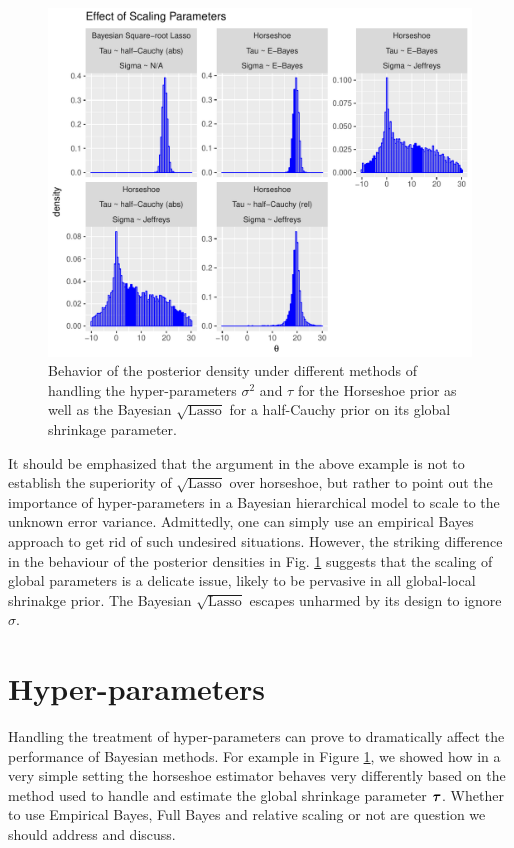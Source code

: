 \documentclass[10pt]{article}
\def\sql{$\sqrt{\text{Lasso}}$}
\begin{document}
\begin{figure}[!ht]%
\centering
\includegraphics[width=0.9\columnwidth]{art/effect_of_sigma}%
\caption{Behavior of the posterior density under different methods of handling the hyper-parameters $\sigma^2$ and $\tau$ for the Horseshoe prior as well as the Bayesian \sql{} for a half-Cauchy prior on its global shrinkage parameter. }%
\label{fig:effect-sigma}%
\end{figure}

It should be emphasized that the argument in the above example is not to establish the superiority of \sql{} over horseshoe, but rather to point out the importance of hyper-parameters in a Bayesian hierarchical model to scale to the unknown error variance. Admittedly, one can simply use an empirical Bayes approach to get rid of such undesired situations. However, the striking difference in the behaviour of the posterior densities in Fig. \ref{fig:effect-sigma} suggests that the scaling of global parameters is a delicate issue, likely to be pervasive in all global-local shrinakge prior. The Bayesian \sql{} escapes unharmed by its design to ignore $\sigma$. 

\section{Hyper-parameters}\label{sec:hyper}

Handling the treatment of hyper-parameters can prove to dramatically affect the performance of Bayesian  methods. For example in Figure \ref{fig:effect-sigma}, we showed how in a very simple setting the horseshoe estimator behaves very differently based on the method used to handle and estimate the global shrinkage parameter $\boldsymbol{\tau}$. Whether to use Empirical Bayes, Full Bayes and relative scaling or not are question we should address and discuss.
\end{document}
